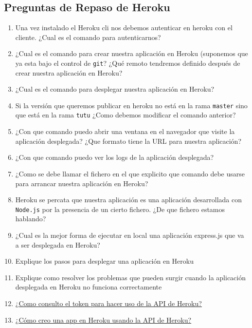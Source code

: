 \subsection{Preguntas de Repaso de
Heroku}\label{preguntas-de-repaso-de-heroku}

\begin{enumerate}
\def\labelenumi{\arabic{enumi}.}
\item
  Una vez instalado el Heroku cli nos debemos autenticar en heroku con
  el cliente. ¿Cual es el comando para autenticarnos?
\item
  ¿Cual es el comando para crear nuestra aplicación en Heroku (suponemos
  que ya esta bajo el control de \texttt{git}? ¿Qué remoto tendremos
  definido después de crear nuestra aplicación en Heroku?
\item
  ¿Cual es el comando para desplegar nuestra aplicación en Heroku?
\item
  Si la versión que queremos publicar en heroku no está en la rama
  \texttt{master} sino que está en la rama \texttt{tutu} ¿Como debemos
  modificar el comando anterior?
\item
  ¿Con que comando puedo abrir una ventana en el navegador que visite la
  aplicación desplegada? ¿Que formato tiene la URL para nuestra
  aplicación?
\item
  ¿Con que comando puedo ver los logs de la aplicación desplegada?
\item
  ¿Como se debe llamar el fichero en el que explicito que comando debe
  usarse para arrancar nuestra aplicación en Heroku?
\item
  Heroku se percata que nuestra aplicación es una aplicación
  desarrollada con \texttt{Node.js} por la presencia de un cierto
  fichero. ¿De que fichero estamos hablando?
\item
  ¿Cual es la mejor forma de ejecutar en local una aplicación express.js
  que va a ser desplegada en Heroku?
\item
  Explique los pasos para desplegar una aplicación en Heroku
\item
  Explique como resolver los problemas que pueden surgir cuando la
  aplicación desplegada en Heroku no funciona correctamente
\item
  \href{../recursos/heroku.md}{¿Como consulto el token para hacer uso de
  la API de Heroku?}
\item
  \href{../recursos/heroku.md}{¿Cómo creo una app en Heroku usando la
  API de Heroku?}
\end{enumerate}


